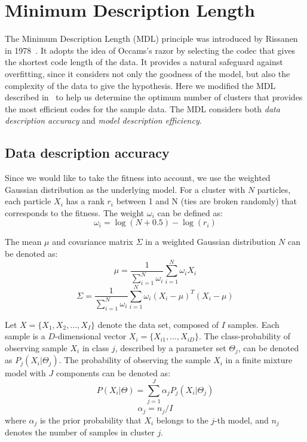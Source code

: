 \section{Minimum Description Length} 
The Minimum Description Length (MDL) principle was introduced by Rissanen in 1978~\cite{Rissanen:1978:MDL}.
It adopts the idea of Occams's razor by selecting the codec that gives the shortest code length of the data.
It provides a natural safeguard against overfitting, 
since it considers not only the goodness of the model, 
but also the complexity of the data to give the hypothesis.
Here we modified the MDL described in~\cite{Kyrgyzov:2007:KMDL} to help us determine the optimum number of clusters that provides the most efficient codes for the sample data.
The MDL considers both \textit{data description accuracy} and \textit{model description efficiency}.


\subsection{Data description accuracy}

Since we would like to take the fitness into account, we use the weighted Gaussian distribution as the underlying model.
For a cluster with $N$ particles, each particle $X_i$ has a rank $r_i$ between 1 and N (ties are broken randomly) that corresponds to the fitness.
The weight $\omega_i$ can be defined as:
\begin{equation}
\omega_i = \log(N+0.5) - \log(r_i)
\end{equation}

The mean $\mu$ and covariance matrix $\Sigma$ in a weighted Gaussian distribution $N$ can be denoted as:
\begin{equation}
\mu = \frac{1}{\sum_{i=1}^N \omega_i} \sum_{i = 1}^{N} \omega_i X_i
\end{equation}
\begin{equation}
\Sigma = \frac{1}{\sum_{i=1}^N \omega_i} \sum_{i = 1}^{N} \omega_i (X_i - \mu)^T (X_i - \mu)
\end{equation}


Let $X = \{X_1, X_2, ..., X_I\}$ denote the data set, composed of $I$ samples. 
Each sample is a $D$-dimensional vector $X_i = \{X_{i1}, ..., X_{iD}\}$.  
The class-probability of observing sample $X_i$ in class $j$, described by a parameter set $\Theta_j$, can be denoted as $P_j(X_i|\Theta_j)$.
The probability of observing the sample $X_i$ in a finite mixture model with $J$ components can be denoted as:
\begin{equation}
P(X_i|\Theta) = \sum_{j=1}^J \alpha_j P_j ( X_i | \Theta_j )
\end{equation}
\begin{equation}
\alpha_j = n_j / I
\end{equation}
where $\alpha_j$ is the prior probability that $X_i$ belongs to the $j$-th model, 
and $n_j$ denotes the number of samples in cluster $j$.  

